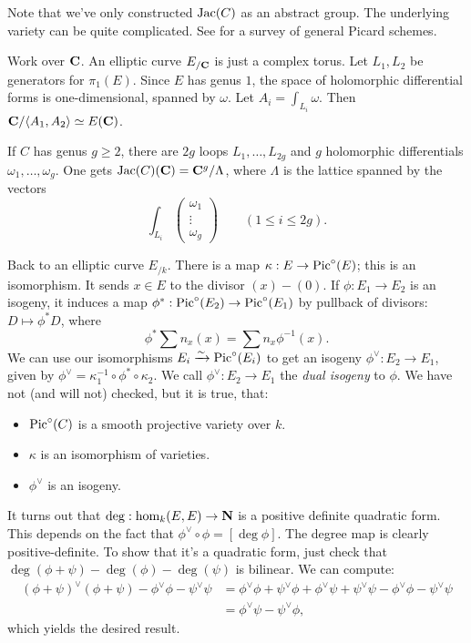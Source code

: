 Note that we've only constructed $\operatorname{Jac}(C)$ as an abstract group. The 
underlying variety can be quite complicated. See \cite{kleiman-2005} for a 
survey of general Picard schemes. 

\begin{example}
Work over $\mathbf{C}$. An elliptic curve $E_{/\mathbf{C}}$ is just a complex torus. Let 
$L_1,L_2$ be generators for $\pi_1(E)$. Since $E$ has genus $1$, the space of 
holomorphic differential forms is one-dimensional, spanned by $\omega$. Let 
$A_i=\int_{L_i} \omega$. Then $\mathbf{C}/\langle A_1,A_2\rangle\simeq E(\mathbf{C})$. 
\end{example}

If $C$ has genus $g\geqslant 2$, there are $2 g$ loops $L_1,\dots,L_{2 g}$ and 
$g$ holomorphic differentials $\omega_1,\dots,\omega_g$. One gets 
$\operatorname{Jac}(C)(\mathbf{C}) = \mathbf{C}^g / \Lambda$, where $\Lambda$ is the lattice spanned 
by the vectors 
\[
  \int_{L_i} \begin{pmatrix} \omega_1 \\ \vdots \\ \omega_g \end{pmatrix}\qquad (1\leqslant i \leqslant 2 g ).
\]

Back to an elliptic curve $E_{/k}$. There is a map 
$\kappa:E\to \operatorname{Pic}^\circ(E)$; this is an isomorphism. It sends 
$x\in E$ to the divisor $(x)-(0)$. If $\phi:E_1\to E_2$ is an isogeny, it 
induces a map $\phi^\ast:\operatorname{Pic}^\circ(E_2)\to \operatorname{Pic}^\circ(E_1)$ by 
pullback of divisors: $D\mapsto \phi^\ast D$, where 
\[
  \phi^\ast \sum n_x(x) = \sum n_x \phi^{-1}(x) .
\]
We can use our isomorphisms $E_i\xrightarrow\sim \operatorname{Pic}^\circ(E_i)$ to get an isogeny 
$\phi^\vee:E_2\to E_1$, given by 
$\phi^\vee = \kappa_1^{-1}\circ \phi^\ast\circ \kappa_2$. We call 
$\phi^\vee:E_2\to E_1$ the \emph{dual isogeny} to $\phi$. We have not (and will 
not) checked, but it is true, that: 
\begin{itemize}
  \item $\operatorname{Pic}^\circ(C)$ is a smooth projective variety over $k$. 
  \item $\kappa$ is an isomorphism of varieties. 
  \item $\phi^\vee$ is an isogeny. 
\end{itemize}

It turns out that $\deg:\hom_k(E,E)\to \mathbf{N}$ is a positive definite quadratic 
form. This depends on the fact that $\phi^\vee\circ\phi=[\deg\phi]$. The 
degree map is clearly positive-definite. To show that it's a quadratic form, 
just check that $\deg(\phi+\psi)-\deg(\phi)-\deg(\psi)$ is bilinear. We can 
compute: 
\begin{align*}
  (\phi+\psi)^\vee(\phi+\psi) - \phi^\vee \phi - \psi^\vee \psi 
    &= \phi^\vee\phi + \psi^\vee \phi + \phi^\vee \psi + \psi^\vee \psi - \phi^\vee \phi - \psi^\vee \psi \\
    &= \phi^\vee \psi - \psi^\vee  \phi ,
\end{align*}
which yields the desired result. 

